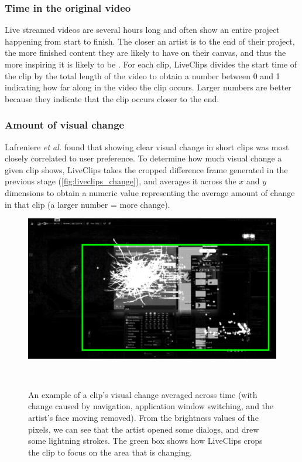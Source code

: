 \subsubsection{Time in the original video}
Live streamed videos are several hours long and often show an entire project happening from start to finish. The closer an artist is to the end of their project, the more finished content they are likely to have on their canvas, and thus the more inspiring it is likely to be%
. For each clip, LiveClips divides the start time of the clip by the total length of the video to obtain a number between 0 and 1 indicating how far along in the video the clip occurs. Larger numbers are better because they indicate that the clip occurs closer to the end.

\subsubsection{Amount of visual change}
 Lafreniere \textit{et al.} \cite{Lafreniere2014} found that showing clear visual change in short clips was most closely correlated to user preference. To determine how much visual change a given clip shows, LiveClips takes the cropped difference frame generated in the previous stage (\autoref{fig:liveclips_change}), and averages it across the $x$ and $y$ dimensions to obtain a numeric value representing the average amount of change in that clip (a larger number = more change).

\begin{figure}[t!]
\centering
  \includegraphics[width=0.7\columnwidth]{liveclips/figures/change.png}
  \caption[An example of a clip's visual change averaged across time (with change caused by navigation, application window switching, and the artist's face moving removed).]{An example of a clip's visual change averaged across time (with change caused by navigation, application window switching, and the artist's face moving removed). From the brightness values of the pixels, we can see that the artist opened some dialogs, and drew some lightning strokes. The green box shows how LiveClips crops the clip to focus on the area that is changing. }~\label{fig:liveclips_change}
\end{figure}

